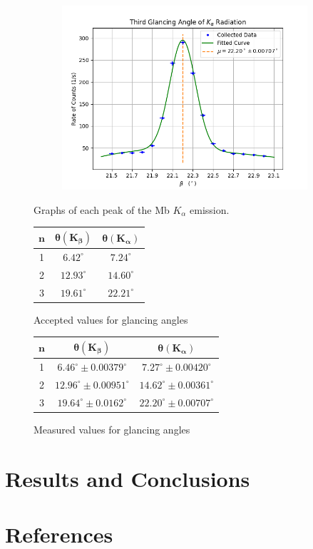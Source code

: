 \documentclass[twocolumn]{article}
\begin{document}
\begin{figure}[h!]
				\begin{subfigure}{.33\textwidth}
					\begin{center}
						\includegraphics[width = \textwidth]{../Graphs/Peak 6}
					\end{center}
					\label{alpha 3}
				\end{subfigure}
				\caption{Graphs of each peak of the Mb $K_\alpha$ emission.}
				\label{fig: alpha}
			\end{figure}
		\begin{figure}
			\centering
			\begin{tabular}{|c|c|c|}
				\hline
				$\mathbf{n}$ & $\boldsymbol{\theta}(\mathbf{K}_{\boldsymbol{\beta}})$ & $\boldsymbol{\theta}(\mathbf{K}_{\boldsymbol{\alpha}})$\\
				\hline
				1& $6.42^\circ$& $7.24^\circ$\\
				2& $12.93^\circ$& $14.60^\circ$\\
				3& $19.61^\circ$& $22.21^\circ$\\
				\hline
			\end{tabular}
			\caption{Accepted values for glancing angles}
			\label{truevalue}
		\end{figure}
		\begin{figure}
			\centering
			\begin{tabular}{|c|c|c|}
				\hline
				$\mathbf{n}$ & $\boldsymbol{\theta}(\mathbf{K}_{\boldsymbol{\beta}})$ & $\boldsymbol{\theta}(\mathbf{K}_{\boldsymbol{\alpha}})$\\
				\hline
				1& $6.46^\circ\pm 0.00379^\circ$&$7.27^\circ\pm 0.00420^\circ$\\
				2& $12.96^\circ\pm 0.00951^\circ$&$14.62^\circ\pm 0.00361^\circ$\\
				3& $19.64^\circ\pm 0.0162^\circ$&$22.20^\circ\pm 0.00707^\circ$\\
				\hline
			\end{tabular}
			\caption{Measured values for glancing angles}
			\label{foundvalue}
		\end{figure}
			
	\section{Results and Conclusions}
	
	\newpage
	\section*{References}
	
\end{document}
